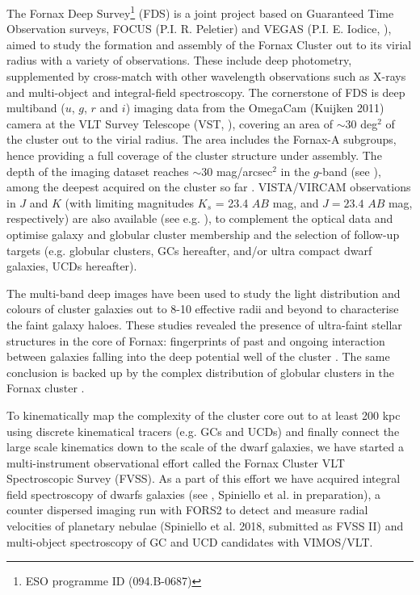 \documentclass[useAMS,usenatbib]{mn2e}
\begin{document}
The Fornax Deep Survey\footnote{ESO programme ID (094.B-0687)} (FDS) is a joint 
project based on Guaranteed Time Observation surveys, FOCUS (P.I. R. Peletier) 
and VEGAS (P.I. E. Iodice, \citealt{capaccioli+15}), aimed to study the 
formation and assembly of the Fornax Cluster out to its virial radius with a 
variety of observations. These include
deep photometry, supplemented by cross-match with other wavelength observations 
such as  X-rays \citep[][e.g.,]{Paolillo02} and multi-object and integral-field 
spectroscopy.
The cornerstone of FDS is deep multiband ($u$, $g$, $r$ and $i$) imaging data 
from the OmegaCam (Kuijken 2011) camera at the VLT Survey Telescope (VST, 
\citealt{schipani+12}), covering an area of $\sim30$ deg$^2$ of the cluster out 
to the virial radius. The area includes the Fornax-A subgroups, hence providing 
a full coverage of the cluster structure under assembly.  The depth of the 
imaging dataset reaches $\sim 30$ mag/arcsec$^2$ in the $g$-band (see \citealt{Iodice16,iodice17}
), among the deepest acquired on the cluster so far \citep{venhola+17}. 
VISTA/VIRCAM observations in $J$ and $K$ (with limiting magnitudes $K_s$ = 23.4 $AB$ mag, and 
$J = 23.4$ $AB$ mag, respectively) are also available (see e.g. \citealt{munoz+15}), to 
complement the optical data and optimise galaxy and globular cluster membership 
and the selection of follow-up targets (e.g. globular clusters, GCs hereafter, 
and/or ultra compact dwarf galaxies, UCDs hereafter). 

The multi-band deep images have been used to study the light distribution and 
colours of cluster galaxies out to 8-10 effective radii and beyond to 
characterise the faint galaxy haloes. These studies revealed the presence of 
ultra-faint stellar structures in the core of Fornax: fingerprints of past and 
ongoing interaction between galaxies falling into the deep potential well of 
the cluster \citep{Iodice16,venhola+17}. The same conclusion is 
backed up by the complex distribution of globular clusters in the Fornax 
cluster \citep{DAbrusco16,cantiello+17}.

To kinematically map the complexity of the cluster core out to at least 200 kpc 
using discrete kinematical tracers (e.g. GCs and UCDs) and finally connect the 
large scale kinematics down to the scale of the dwarf galaxies, we have started 
a multi-instrument observational effort called the Fornax Cluster VLT 
Spectroscopic Survey (FVSS). As a part of this effort we have acquired integral 
field spectroscopy of dwarfs galaxies (see \citealt{mentz+16}, Spiniello et al. 
in preparation), a counter dispersed imaging run with FORS2 to detect and 
measure radial velocities of planetary nebulae (Spiniello et al. 2018, 
submitted as FVSS II) and multi-object spectroscopy of GC and UCD candidates 
with VIMOS/VLT.
\end{document}
